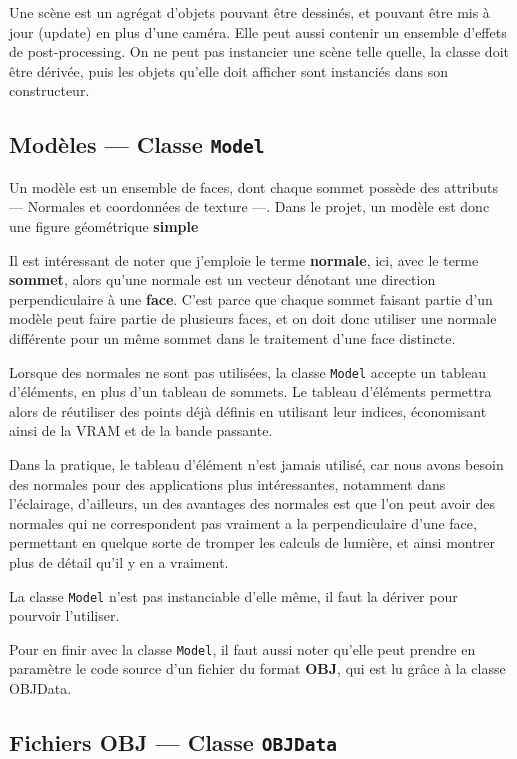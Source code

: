 \documentclass[pdftex, 11pt, a4paper, titlepage]{article}
\begin{document}
Une scène est un agrégat d'objets pouvant être dessinés, et pouvant
être mis à jour (update) en plus d'une caméra.  Elle peut aussi
contenir un ensemble d'effets de post-processing. On ne peut pas
instancier une scène telle quelle, la classe doit être dérivée,
puis les objets qu'elle doit afficher sont instanciés dans son
constructeur.

\subsection{Modèles --- Classe \texttt{Model}}

Un modèle est un ensemble de faces, dont chaque sommet possède des
attributs --- Normales et coordonnées de texture ---.  Dans le projet,
un modèle est donc une figure géométrique \textbf{simple}

Il est intéressant de noter que j'emploie le terme \textbf{normale},
ici, avec le terme \textbf{sommet}, alors qu'une normale est un
vecteur dénotant une direction perpendiculaire à une
\textbf{face}. C'est parce que chaque sommet faisant partie d'un modèle
peut faire partie de plusieurs faces, et on doit donc utiliser une
normale différente pour un même sommet dans le traitement d'une face
distincte.

Lorsque des normales ne sont pas utilisées, la classe \texttt{Model}
accepte un tableau d'éléments, en plus d'un tableau de sommets. Le
tableau d'éléments permettra alors de réutiliser des points déjà
définis en utilisant leur indices, économisant ainsi de la VRAM et de
la bande passante.

Dans la pratique, le tableau d'élément n'est jamais utilisé, car nous
avons besoin des normales pour des applications plus intéressantes,
notamment dans l'éclairage, d'ailleurs, un des avantages des normales
est que l'on peut avoir des normales qui ne correspondent pas vraiment
a la perpendiculaire d'une face, permettant en quelque sorte de
tromper les calculs de lumière, et ainsi montrer plus de détail qu'il
y en a vraiment.

La classe \texttt{Model} n'est pas instanciable d'elle même, il faut
la dériver pour pourvoir l'utiliser.

Pour en finir avec la classe \texttt{Model}, il faut aussi noter
qu'elle peut prendre en paramètre le code source d'un fichier du
format \textbf{OBJ}, qui est lu grâce à la classe OBJData.

\pagebreak
\subsection{Fichiers OBJ --- Classe \texttt{OBJData}}
\end{document}
